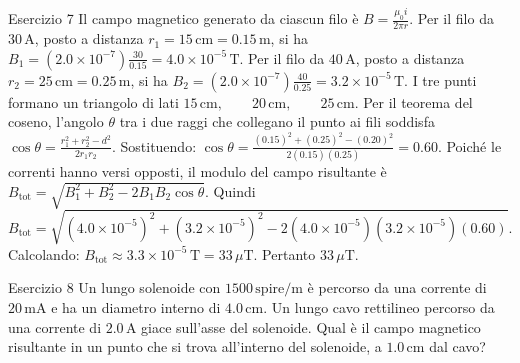 \documentclass[a4paper]{article}
\begin{document}
\begin{snippetsolution}{Esercizio 7}
    Il campo magnetico generato da ciascun filo è
    \(B = \frac{\mu_0 i}{2\pi r}.\)
    Per il filo da \(30\,\mathrm{A}\), posto a distanza
    \(r_1 = 15\,\mathrm{cm}=0.15\,\mathrm{m}\), si ha
    \(B_1 = \left(2.0 \times 10^{-7}\right) \frac{30}{0.15} = 4.0 \times 10^{-5}\,\mathrm{T}.\)
    Per il filo da \(40\,\mathrm{A}\), posto a distanza
    \(r_2 = 25\,\mathrm{cm}=0.25\,\mathrm{m}\), si ha
    \(B_2 = \left(2.0 \times 10^{-7}\right) \frac{40}{0.25} = 3.2 \times 10^{-5}\,\mathrm{T}.\)
    I tre punti formano un triangolo di lati
    \(15\,\mathrm{cm}, \qquad 20\,\mathrm{cm}, \qquad 25\,\mathrm{cm}.\)
    Per il teorema del coseno, l'angolo \(\theta\) tra i due raggi che
    collegano il punto ai fili soddisfa
    \(\cos\theta = \frac{r_1^2+r_2^2-d^2}{2r_1r_2}.\)
    Sostituendo:
    \(\cos\theta = \frac{(0.15)^2+(0.25)^2-(0.20)^2} {2(0.15)(0.25)} = 0.60.\)
    Poiché le correnti hanno versi opposti, il modulo del campo risultante è
    \(B_{\mathrm{tot}} = \sqrt{ B_1^2+B_2^2-2B_1B_2\cos\theta }.\)
    Quindi
    \[
        B_{\mathrm{tot}}
        =
        \sqrt{
            \left(4.0 \times 10^{-5}\right)^2
            +
            \left(3.2 \times 10^{-5}\right)^2
            -
            2
            \left(4.0 \times 10^{-5}\right)
            \left(3.2 \times 10^{-5}\right)
            (0.60)
        }.
    \]
    Calcolando:
    \(B_{\mathrm{tot}} \approx 3.3 \times 10^{-5}\,\mathrm{T} = 33\,\mu\mathrm{T}.\)
    Pertanto
    \(\boxed{33\,\mu\mathrm{T}}.\)
\end{snippetsolution}
\begin{snippetexercise}{Esercizio 8}
    Un lungo solenoide con \(1500\,\mathrm{spire/m}\) è percorso da una corrente
    di \(20\,\mathrm{mA}\) e ha un diametro interno di \(4.0\,\mathrm{cm}\).
    Un lungo cavo rettilineo percorso da una corrente di \(2.0\,\mathrm{A}\)
    giace sull'asse del solenoide. Qual è il campo magnetico risultante in un
    punto che si trova all'interno del solenoide, a \(1.0\,\mathrm{cm}\) dal
    cavo?

\end{snippetexercise}
\end{document}
